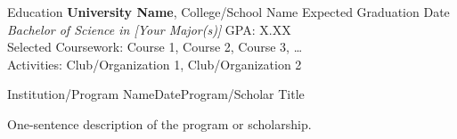 \documentclass[
    11pt, %
]{resume} %
\begin{document}
\vspace{1.25em}

\begin{rSection}{Education}
\textbf{University Name}, College/School Name \hfill Expected Graduation Date\\
\textit{Bachelor of Science in [Your Major(s)]} \hfill GPA: X.XX\\
Selected Coursework: Course 1, Course 2, Course 3, \dots \\ 
Activities: Club/Organization 1, Club/Organization 2

\begin{rSubsection}{Institution/Program Name}{Date}{Program/Scholar Title}{}\vspace{-.3em}
\item[] One-sentence description of the program or scholarship.  
\end{rSubsection}

\end{rSection}
\vspace{-.75em}
\end{document}
